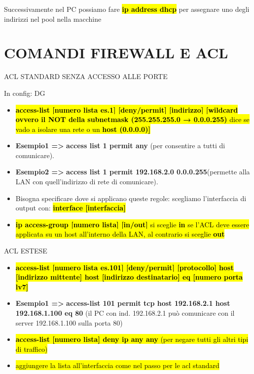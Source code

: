 Successivamente nel PC possiamo fare \textbf{\hl{ip address dhcp}} per
assegnare uno degli indirizzi nel pool nella macchine

\section{COMANDI FIREWALL E ACL}\label{comandi-firewall-e-acl}

ACL STANDARD SENZA ACCESSO ALLE PORTE

In config: DG

\begin{itemize}
\item
  \hl{\textbf{access-list {[}numero lista es.1{]} {[}deny/permit{]}
  {[}indirizzo{]} {[}wildcard ovvero il NOT della subnetmask
  (255.255.255.0 → 0.0.0.255)} dice se vado a isolare una rete o un
  \textbf{host (0.0.0.0){]}}}
\item
  \textbf{Esempio1 =\textgreater{}} \textbf{access list 1 permit any}
  (per consentire a tutti di comunicare).
\item
  \textbf{Esempio2 =\textgreater{}} \textbf{access list 1 permit
  192.168.2.0 0.0.0.255}(permette alla LAN con quell'indirizzo di rete
  di comunicare).
\item
  Bisogna specificare dove si applicano queste regole: scegliamo
  l'interfaccia di output con: \textbf{\hl{interface {[}interfaccia{]}}}
\item
  \hl{\textbf{ip access-group {[}numero lista{]} {[}in/out{]}} si
  sceglie \textbf{in} se l'ACL deve essere applicata su un host
  all'interno della LAN, al contrario si sceglie \textbf{out}}
\end{itemize}

ACL ESTESE

\begin{itemize}
\item
  \textbf{\hl{access-list {[}numero lista es.101{]} {[}deny/permit{]}
  {[}protocollo{]} host {[}indirizzo mittente{]} host {[}indirizzo
  destinatario{]} eq {[}numero porta lv7{]}}}
\item
  \textbf{Esempio1 =\textgreater{}} \textbf{access-list 101 permit tcp
  host 192.168.2.1 host 192.168.1.100 eq 80} (il PC con ind. 192.168.2.1
  può comunicare con il server 192.168.1.100 sulla porta 80)
\item
  \hl{\textbf{access-list {[}numero lista{]} deny ip any any} (per
  negare tutti gli altri tipi di traffico)}
\item
  \hl{aggiungere la lista all'interfaccia come nel passo per le acl
  standard}
\end{itemize}

